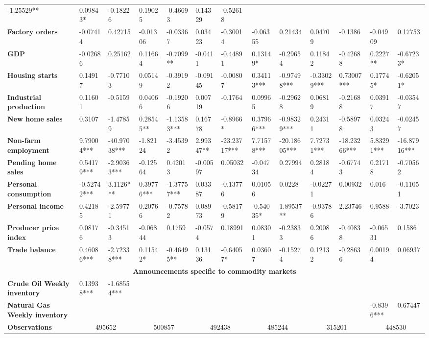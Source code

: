 \begin{sidewaystable}
{\begin{tabular}{@{}lllllllllllll@{}}
-1.25529** & 0.09843* & -0.18226 & 0.19025 & -0.46693 & 0.14329 & -0.52618 \\ \textbf{Factory orders}& -0.07414 & 0.42715 & -0.01306 & -0.03367 & 0.03423 & -0.30014 & -0.06355 & 0.21434 & 0.04709 & -0.1386 & -0.04909 & 0.17753 \\ \textbf{GDP}& -0.02686 & 0.25162 & 0.11664 & -0.7099** & -0.0411 & -0.44891 & 0.13149* & -0.29654 & 0.11842 & -0.42688 & 0.2227** & -0.67233* \\ \textbf{Housing starts}& 0.14917 & -0.77103 & 0.05149 & -0.39192 & -0.09145 & -0.00807 & 0.34113*** & -0.97498*** & -0.33029*** & 0.73007*** & 0.17745* & -0.62051* \\ \textbf{Industrial production}& 0.11601 & -0.5159 & 0.04066 & -0.19206 & 0.00719 & -0.1764 & 0.09965 & -0.29628 & 0.06819 & -0.21688 & 0.03917 & -0.03547 \\ \textbf{New home sales}& 0.3107 & -1.47859 & 0.28545** & -1.13583*** & 0.16778 & -0.8966* & 0.37966*** & -0.98329*** & 0.24311 & -0.58978 & 0.03243 & -0.02457 \\ \textbf{Non-farm employment}& 9.79004*** & -40.97038*** & -1.82124 & -3.45392 & 2.99347** & -23.23717*** & 7.71578*** & -20.18605*** & 7.72731*** & -18.23266*** & 5.83291*** & -16.87916*** \\ \textbf{Pending home sales}& 0.54179*** & -2.90363*** & -0.12564 & 0.42013 & -0.00597 & 0.05032 & -0.04734 & 0.27994 & 0.28184 & -0.67743 & 0.21718 & -0.70562 \\ \textbf{Personal consumption}& -0.52742*** & 3.1126*** & 0.39776*** & -1.37757*** & 0.03387 & -0.13776 & 0.01056 & 0.0228 & -0.02271 & 0.00932 & 0.016 & -0.11051 \\ \textbf{Personal income}& 0.42185 & -2.59771 & 0.20766 & -0.75782 & 0.08973 & -0.58179 & -0.54035* & 1.89537** & -0.93786 & 2.23746 & 0.9588 & -3.7023 \\ \textbf{Producer price index}& 0.08176 & -0.34513 & -0.06844 & 0.1759 & -0.0574 & 0.18991 & 0.08301 & -0.23833 & 0.20086 & -0.40838 & -0.06531 & 0.1586 \\ \textbf{Trade balance}& 0.46086*** & -2.72338*** & 0.11542* & -0.46495** & 0.13136 & -0.64057* & 0.03607 & -0.15274 & 0.12132 & -0.28636 & 0.00194 & 0.06937 \\  \midrule \multicolumn{13}{c}{\textbf{Announcements specific to commodity markets}} \\ \midrule \textbf{Crude Oil Weekly inventory}& 0.13938*** & -1.68554*** &  &  &  &  &  &  &  &  &  &  \\ \textbf{Natural Gas Weekly inventory}&  &  &  &  &  &  &  &  &  &  & -0.8396*** & 0.67447 \\  \midrule \textbf{Observations}             &\multicolumn{2}{c}{ 495652 }                                                 & \multicolumn{2}{c}{ 500857 }                                                 & \multicolumn{2}{c}{ 492438 }                                                 & \multicolumn{2}{c}{ 485244 }                                                 & \multicolumn{2}{c}{ 315201 }                                                   & \multicolumn{2}{c}{ 448530 }                         
\end{tabular}}
\end{sidewaystable}
